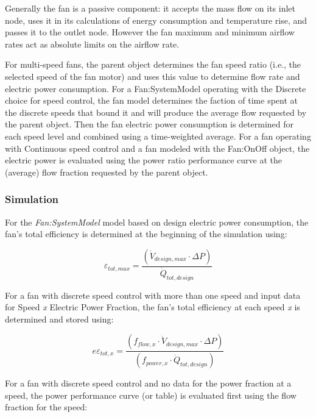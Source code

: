 Generally the fan is a passive component: it accepts the mass flow on its inlet node, uses it in its calculations of energy consumption and temperature rise, and passes it to the outlet node. However the fan maximum and minimum airflow rates act as absolute limits on the airflow rate.

For multi-speed fans, the parent object determines the fan speed ratio (i.e., the selected speed of the fan motor) and uses this value to determine flow rate and electric power consumption.  For a Fan:SystemModel operating with the Discrete choice for speed control, the fan model determines the faction of time spent at the discrete speeds that bound it and will produce the average flow requested by the parent object.  Then the fan electric power consumption is determined for each speed level and combined using a time-weighted average.  For a fan operating with Continuous speed control and a fan modeled with the Fan:OnOff object, the electric power is evaluated using the power ratio performance curve at the (average) flow fraction requested by the parent object. 

\subsubsection{Simulation}\label{simulation}

For the \emph{Fan:SystemModel} model based on design electric power consumption, the fan's total efficiency is determined at the beginning of the simulation using:

\begin{equation}
{\varepsilon_{tot,max}} = \frac{({\dot V_{design,max} \cdot \Delta P  } )}{{ \dot Q_{tot, design}}}
\end{equation}

For a fan with discrete speed control with more than one speed and input data for Speed \emph{x} Electric Power Fraction, the fan's total efficiency at each speed \emph{x} is determined and stored using:

\begin{equation}
{e\varepsilon_{tot,x}} = \frac {({f_{flow,x}} \cdot {\dot V_{design,max} \cdot \Delta P  } )}{( {f_{power,x}} \cdot { \dot Q_{tot, design}})}
\end{equation}

For a fan with discrete speed control and no data for the power fraction at a speed, the power performance curve (or table) is evaluated first using the flow fraction for the speed:


